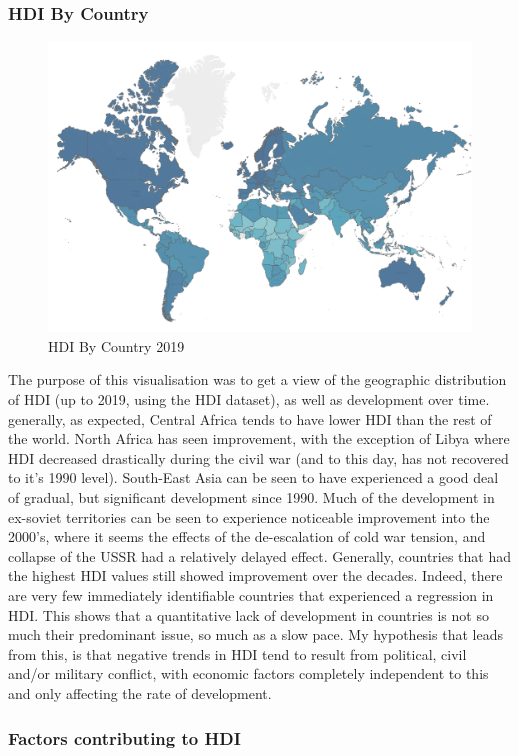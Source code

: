 \documentclass[ 10pt ]{fphw}
\begin{document}
\subsubsection*{HDI By Country}
\begin{center}
\begin{figure}[h!]
    \centering
	\includegraphics[width=0.5\columnwidth]{wmap.png} 
	\caption{HDI By Country 2019}
	\label{fig1:wmap}
	\end{figure}
\end{center}

The purpose of this visualisation was to get a view of the geographic distribution of HDI (up to 2019, using the HDI dataset), as well as development over time. generally, as expected, Central Africa tends to have lower HDI than the rest of the world. North Africa has seen improvement, with the exception of Libya where HDI decreased drastically during the civil war (and to this day, has not recovered to it's 1990 level). South-East Asia can be seen to have experienced a good deal of gradual, but significant development since 1990. Much of the development in ex-soviet territories can be seen to experience noticeable improvement into the 2000's, where it seems the effects of the de-escalation of cold war tension, and collapse of the USSR had a relatively delayed effect. Generally, countries that had the highest HDI values still showed improvement over the decades. Indeed, there are very few immediately identifiable countries that experienced a regression in HDI. This shows that a quantitative lack of development in countries is not so much their predominant issue, so much as a slow pace. My hypothesis that leads from this, is that negative trends in HDI tend to result from political, civil and/or military conflict, with economic factors completely independent to this and only affecting the rate of development.

\subsubsection*{Factors contributing to HDI}
\end{document}
